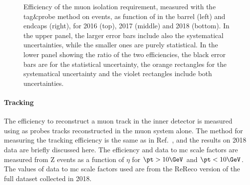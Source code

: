 \begin{figure}[htbp]
\begin{center}
    \caption{Efficiency of the muon isolation requirement, measured with the tag\&probe method on \Z events, as function of \pt in the barrel (left) and endcaps (right), for 2016 (top), 2017 (middle) and 2018 (bottom). In the upper panel, the larger error bars include also the systematical uncertainties, while the smaller ones are purely statistical. In the lower panel showing the ratio of the two efficiencies, the black error bars are for the statistical uncertainty, the orange rectangles for the systematical uncertainty and the violet rectangles include both uncertainties.}
    \label{fig:MuonIDEff_3}
\end{center}
\end{figure}

\paragraph*{Tracking}
The efficiency to reconstruct a muon track in the inner detector is measured using as probes tracks
reconstructed in the muon system alone. The method for measuring the tracking efficiency is the same as 
 in Ref.~\cite{CMS_AN_2015-215}, and the results on 2018 data are briefly discussed here. The efficiency and 
data to mc scale factors are measured from Z events as a function of $\eta$ for $\pt > 10\GeV$ and $\pt < 10\GeV$. The values of data to mc scale factors 
used are from the ReReco version of the full dataset collected in 2018. 

